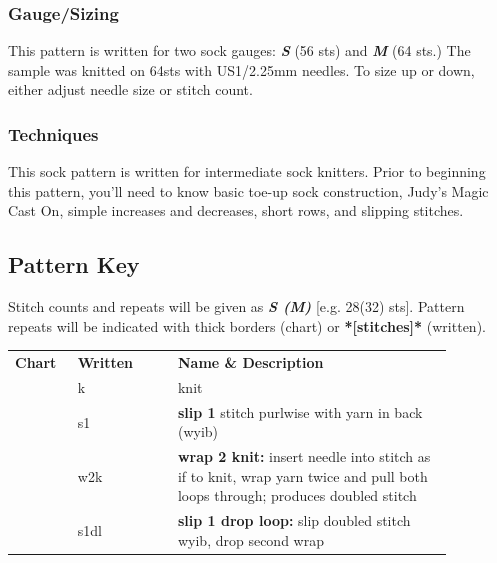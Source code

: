 \documentclass[12pt]{article}
\newcommand{\vocab}[1]{\emph{\textbf{#1}}} %
\begin{document}
\begin{titlingpage}
\begin{multicols}{2}
\subsubsection*{Gauge/Sizing}

This pattern is written for two sock gauges: \vocab{S} (56 sts) and \vocab{M} (64 sts.) The sample was knitted on 64sts with US1/2.25mm needles. To size up or down, either adjust needle size or stitch count.

\subsubsection*{Techniques}

This sock pattern is written for intermediate sock knitters. Prior to beginning this pattern, you'll need to know basic toe-up sock construction, Judy's Magic Cast On, simple increases and decreases, short rows, and slipping stitches.

\vfill 
\columnbreak

\small 			%
\subsection*{Pattern Key}
Stitch counts and repeats will be given as \vocab{S (M)} [e.g. 28(32) sts]. Pattern repeats will be indicated with thick borders (chart) or \textbf{*[stitches]*} (written).

\vspace{-1em}

\begin{center}
\begin{tabular}{| C{0.12\linewidth}  C{0.2\linewidth}  p{0.55\linewidth} | }
\thickhline {} 
\textbf{Chart}	& \textbf{Written}	& \textbf{Name \& Description} \\ \thickhline
\chart{-}	& k	&  knit	\\
	& s1		& \textbf{slip 1} stitch purlwise with yarn in back (wyib) \\
	& w2k		& \textbf{wrap 2 knit:} insert needle into stitch as if to knit, wrap yarn twice and pull both loops through; produces doubled stitch \\
	& s1dl		& \textbf{slip 1 drop loop:} slip doubled stitch wyib, drop second wrap \\ \hline
\end{tabular}

\vspace{1em}


\end{center}
\end{multicols}
\end{titlingpage}
\end{document}
